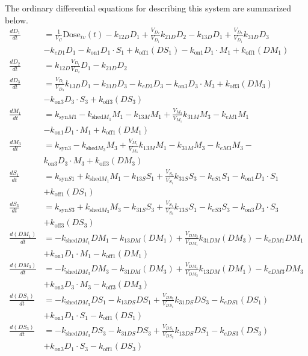 The ordinary differential equations for describing this system are summarized below.
\begin{align}
\frac{dD_1}{dt} &= \frac{1}{V_C}\text{Dose}_{iv}(t) - k_{12D}D_1 + \frac{V_{D_2}}{V_{D_1}}k_{21D}D_2 - k_{13D}D_1 \nonumber 
+ \frac{V_{D_3}}{V_{D_1}}k_{31D}D_3\\& - k_{eD1}D_1 - k_{\text{on}1}D_1 \cdot S_1 + k_{\text{off}1}(DS_1)- k_{\text{on}1}D_1 \cdot M_1 + k_{\text{off}1}(DM_1)  \\
\frac{dD_2}{dt} &= k_{12D}\frac{V_{D_1}}{V_{D_2}}D_1 - k_{21D}D_2 \\
\frac{dD_3}{dt} &= \frac{V_{D_1}}{V_{D_3}}k_{13D}D_1 - k_{31D}D_3 - k_{eD3}D_3- k_{\text{on}3}D_3 \cdot M_3 + k_{\text{off}3}(DM_3)\nonumber  \\&- k_{\text{on}3}D_3 \cdot S_3 + k_{\text{off}3}(DS_3) \\
\frac{dM_1}{dt} &= k_{\text{syn}M1}-k_{\text{shed}M_1}M_1 - k_{13M}M_1 + \frac{V_{M_3}}{V_{M_1}}k_{31M}M_3- k_{eM1}M_1\nonumber  \\&- k_{\text{on}1}D_1 \cdot M_1 + k_{\text{off}1}(DM_1)  \\
\frac{dM_3}{dt} &= k_{\text{syn}3}-k_{\text{shed}M_3}M_3  + \frac{V_{M_1}}{V_{M_3}}k_{13M}M_1 - k_{31M}M_3 - k_{eM3}M_3-\nonumber \\& k_{\text{on}3}D_3 \cdot M_3 + k_{\text{off}3}(DM_3) \\
\frac{dS_1}{dt} &= k_{\text{syn}S1}+k_{\text{shed}M_1}M_1  - k_{13S}S_1 + \frac{V_{S_3}}{V_{S_1}}k_{31S}S_3 - k_{eS1}S_1 - k_{\text{on}1}D_1 \cdot S_1 \nonumber\\ & + k_{\text{off}1}(DS_1)  \\
\frac{dS_3}{dt} &= k_{\text{syn}S3}+k_{\text{shed}M_3}M_3  - k_{31S}S_3 + \frac{V_{S_1}}{V_{S_3}}k_{13S}S_1 - k_{eS3}S_3 - k_{\text{on}3}D_3 \cdot S_3 \nonumber\\ & + k_{\text{off}3}(DS_3)  \\
\frac{d(DM_1)}{dt} &=-k_{\text{shed}DM_1}DM_1 - k_{13DM}(DM_1) + \frac{V_{DM_3}}{V_{DM_1}}k_{31DM}(DM_3)  - k_{eDM1}DM_1\nonumber\\&+k_{\text{on}1}D_1 \cdot M_1 - k_{\text{off}1}(DM_1)  \\
\frac{d(DM_3)}{dt} &= -k_{\text{shed}DM_3}DM_3 - k_{31DM}(DM_3) + \frac{V_{DM_1}}{V_{DM_3}}k_{13DM}(DM_1)  - k_{eDM3}DM_3\nonumber \\&+k_{\text{on}3}D_3 \cdot M_3 - k_{\text{off}3}(DM_3)  \\
\frac{d(DS_1)}{dt} &=-k_{\text{shed}DM_3}DS_1  - k_{13DS}DS_1 + \frac{V_{DS_3}}{V_{DS_1}}k_{31DS}DS_3 - k_{eDS1}(DS_1)  \nonumber\\ &+ k_{\text{on}1}D_1 \cdot S_1 - k_{\text{off}1}(DS_1)  \\
\frac{d(DS_3)}{dt} &=-k_{\text{shed}DM_3}DS_3  - k_{31DS}DS_3 + \frac{V_{DS_1}}{V_{DS_3}}k_{13DS}DS_1 - k_{eDS3}(DS_3)  \nonumber\\ &+ k_{\text{on}3}D_1 \cdot S_3 - k_{\text{off}1}(DS_3)  
\end{align}

